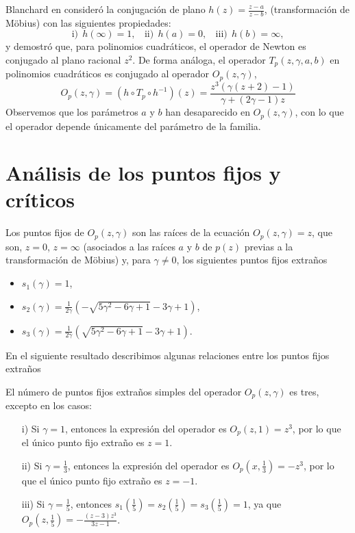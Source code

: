 Blanchard en \cite{blanchard} consideró la conjugación de plano
$\displaystyle h\left( z\right) =\frac{z-a}{z-b}$, (transformación de M\"{o}bius) con las siguientes propiedades:
\begin{equation*}
\mbox{i)} \ \  h\left( \infty \right) =1, \ \  \ \ \mbox{ii)} \ \  h\left(a\right) =0, \ \  \ \ \mbox{iii)} \ \  h\left( b\right) =\infty ,
\end{equation*}
y demostró que, para polinomios cuadráticos, el operador de Newton es conjugado al plano racional $z^{2}$. De forma análoga, el operador $T_{p}(z,\gamma,a,b)$ en polinomios cuadráticos es conjugado al operador $O_{p}\left( z,\gamma\right)$,
\begin{equation}\label{operadorking}
O_{p}\left(z,\gamma\right)=\left( h \circ T_{p} \circ h^{-1} \right) \left( z\right)=\frac{z^3 (\gamma  (z+2)-1)}{\gamma +(2 \gamma -1) z}
\end{equation}
Observemos que los parámetros $a$ y $b$ han desaparecido en $O_{p}(z,\gamma)$, con lo que el operador depende únicamente del parámetro de la familia.

\section{Análisis de los puntos fijos y críticos}
Los puntos fijos de $O_{p}\left( z,\gamma\right)$ son las raíces de la ecuación $O_{p}\left( z,\gamma\right)=z$, que son, $z=0$, $z=\infty$ (asociados a las raíces $a$ y $b$ de $p(z)$ previas a la transformación de M\"{o}bius)
y, para $\gamma \neq 0$, los siguientes puntos fijos extraños
\begin{itemize}
	\item $s_1(\gamma)=1$,
	\item $s_2(\gamma)=\frac{1}{2 \gamma }(-\sqrt{5 \gamma ^2-6 \gamma +1}-3 \gamma +1)$,
	\item $s_3(\gamma)=\frac{1}{2 \gamma }(\sqrt{5 \gamma ^2-6 \gamma +1}-3 \gamma +1)$.
\end{itemize}

En el siguiente resultado describimos algunas relaciones entre los puntos fijos extraños
\begin{lemma} El número de puntos fijos extraños simples del operador $O_{p}\left( z,\gamma\right)$ es tres, excepto en los casos:
	\begin{itemize}
		\item[i)] Si $\gamma=1$, entonces la expresión del operador es $O_{p}(z,1)=z^3$, por lo que el único punto fijo extraño es $z=1$.
		\item[ii)] Si $\gamma=\frac{1}{3}$, entonces la expresión del operador es $O_{p}(x,\frac{1}{3})=-z^3$, por lo que el único punto fijo extraño es $z=-1$.
		\item[iii)] Si $\gamma = \frac{1}{5}$, entonces $s_1(\frac{1}{5})=s_2(\frac{1}{5})=s_3(\frac{1}{5})=1$, ya que $O_{p}(z,\frac{1}{5})=-\frac{(z-3) z^3}{3 z-1}$.
	\end{itemize}
\end{lemma}

